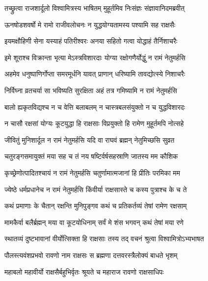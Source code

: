 
\twolineshloka
{तच्छ्रुत्वा राजशार्दूलो विश्वामित्रस्य भाषितम्}
{मुहूर्तमिव निःसंज्ञः संज्ञावानिदमब्रवीत्} %

\twolineshloka
{ऊनषोडशवर्षो मे रामो राजीवलोचनः}
{न युद्धयोग्यतामस्य पश्यामि सह राक्षसैः} %

\twolineshloka
{इयमक्षौहिणी सेना यस्याहं पतिरीश्वरः}
{अनया सहितो गत्वा योद्धाहं तैर्निशाचरैः} %

\twolineshloka
{इमे शूराश्च विक्रान्ता भृत्या मेऽस्त्रविशारदाः}
{योग्या रक्षोगणैर्योद्धुं न रामं नेतुमर्हसि} %

\twolineshloka
{अहमेव धनुष्पाणिर्गोप्ता समरमूर्धनि}
{यावत् प्राणान् धरिष्यामि तावद्योत्स्ये निशाचरैः} %

\twolineshloka
{निर्विघ्ना व्रतचर्या सा भविष्यति सुरक्षिता}
{अहं तत्र गमिष्यामि न रामं नेतुमर्हसि} %

\twolineshloka
{बालो ह्यकृतविद्यश्च न च वेत्ति बलाबलम्}
{न चास्त्रबलसंयुक्तो न च युद्धविशारदः} %

\twolineshloka
{न चासौ रक्षसां योग्यः कूटयुद्धा हि राक्षसाः}
{विप्रयुक्तो हि रामेण मुहूर्तमपि नोत्सहे} %

\twolineshloka
{जीवितुं मुनिशार्दूल न रामं नेतुमर्हसि}
{यदि वा राघवं ब्रह्मन् नेतुमिच्छसि सुव्रत} %

\twolineshloka
{चतुरङ्गसमायुक्तं मया सह च तं नय}
{षष्टिर्वर्षसहस्राणि जातस्य मम कौशिक} %

\twolineshloka
{कृच्छ्रेणोत्पादितश्चायं न रामं नेतुमर्हसि}
{चतुर्णामात्मजानां हि प्रीतिः परमिका मम} %

\twolineshloka
{ज्येष्ठे धर्मप्रधानेच न रामं नेतुमर्हसि}
{किंवीर्या राक्षसास्ते च कस्य पुत्राश्च के च ते} %

\twolineshloka
{कथं प्रमाणाः के चैतान् रक्षन्ति मुनिपुङ्गव}
{कथं च प्रतिकर्तव्यं तेषां रामेण रक्षसाम्} %

\twolineshloka
{मामकैर्वा बलैर्ब्रह्मन् मया वा कूटयोधिनाम्}
{सर्वं मे शंस भगवन् कथं तेषां मया रणे} %

\twolineshloka
{स्थातव्यं दुष्टभावानां वीर्योत्सिक्ता हि राक्षसाः}
{तस्य तद् वचनं श्रुत्वा विश्वामित्रोऽभ्यभाषत} %

\twolineshloka
{पौलस्त्यवंशप्रभवो रावणो नाम राक्षसः}
{स ब्रह्मणा दत्तवरस्त्रैलोक्यं बाधते भृशम्} %

\twolineshloka
{महाबलो महावीर्यो राक्षसैर्बहुभिर्वृतः}
{श्रूयते च महाराज रावणो राक्षसाधिपः} %

